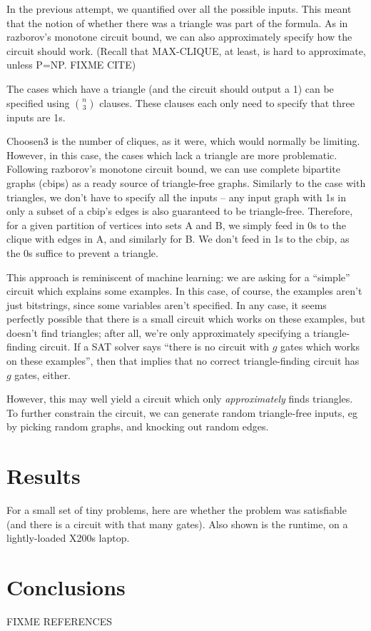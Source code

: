 \documentclass[12pt]{article}
\begin{document}
In the previous attempt, we quantified over all the possible inputs. This meant that the notion of
whether there was a triangle was part of the formula. As in razborov’s monotone circuit bound, we
can also approximately specify how the circuit should work. (Recall that MAX-CLIQUE, at least, is
hard to approximate, unless P=NP. FIXME CITE)

The cases which have a triangle (and the circuit should output a 1) can be specified using
$n \choose 3$ clauses. These clauses each only need to specify that three inputs are 1s.

Choosen3 is the number of cliques, as it were, which would normally be limiting.
However, in this case, the cases which lack a triangle are more problematic. Following razborov's monotone circuit bound, we can use complete bipartite graphs (cbips) as a ready source of triangle-free graphs. Similarly to the case with triangles, we don’t have to specify all the inputs -- any input graph with 1s in only a subset of a cbip’s edges is also guaranteed to be triangle-free. Therefore, for a given partition of vertices into sets A and B, we simply feed in 0s to the clique with edges in A, and similarly for B. We don’t feed in 1s to the cbip, as the 0s suffice to prevent a triangle.

This approach is reminiscent of machine learning: we are asking for a ``simple'' circuit which explains some examples. In this case, of course, the examples aren’t just bitstrings, since some variables aren’t specified. In any case, it seems perfectly possible that there is a small circuit which works on these examples, but doesn’t find triangles; after all, we’re only approximately specifying a triangle-finding circuit. If a SAT solver says ``there is no circuit with $g$ gates which works on these examples'', then that implies that no correct triangle-finding circuit has $g$ gates, either.

However, this may well yield a circuit which only {\em approximately} finds triangles.
To further constrain the circuit, we can generate random triangle-free inputs, eg by picking random graphs, and knocking out random edges.


\section{Results}

For a small set of tiny problems, here are whether the problem was satisfiable
(and there is a circuit with that many gates). Also shown is the runtime, on a
lightly-loaded X200s laptop.


\section{Conclusions}





FIXME REFERENCES
\end{document}
